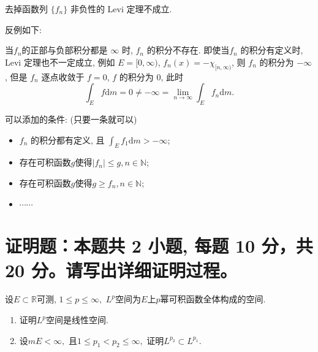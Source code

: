 \begin{solution}
  去掉函数列 \(\{f_n\}\) 非负性的 Levi 定理不成立. 

  反例如下: 

  当\(f_n\)的正部与负部积分都是 \(\infty\) 时, \(f_n\) 的积分不存在. 即使当\(f_n\) 的积分有定义时, Levi 定理也不一定成立, 例如 \(E = [0, \infty)\), \(f_n(x) = - \chi_{[n, \infty)}\), 则 \(f_n\) 的积分为 \(- \infty\), 但是 \(f_n\) 逐点收敛于 \(f = 0\), \(f\) 的积分为 \(0\), 此时
  \[\int_E f \mathrm{d} m = 0 \neq - \infty = \lim_{n \to \infty} \int_E f_n \mathrm{d} m.\]

  可以添加的条件: (只要一条就可以) 
  \begin{itemize}
    \item \(f_n\) 的积分都有定义, 且
    \(\displaystyle \int_E f_1 \mathrm{d} m > - \infty\);
    \item 存在可积函数\(g\)使得\(\lvert f_n \rvert \leqslant g, n \in \mathbb{N}\);
    \item 存在可积函数\(g\)使得\(g \geqslant f_n, n \in \mathbb{N}\);
    \item \(\cdots\cdots\)
  \end{itemize}
\end{solution}


\section{证明题：本题共 2 小题, 每题 10 分，共 20 分。请写出详细证明过程。}


\begin{question}[points = 10]
  设$E \subset \mathbb{R}$可测, $1 \leqslant p \leqslant \infty,$ $L^p$空间为$E$上$p$幂可积函数全体构成的空间.
  \begin{enumerate}
    \item 证明$L^p$空间是线性空间.
    \item 设$m E < \infty,$ 且$1 \leqslant p_1 < p_2 \leqslant \infty,$ 证明$L^{p_2} \subset L^{p_1}.$
  \end{enumerate}

\end{question}

